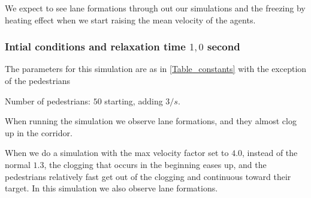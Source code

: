 We expect to see lane formations through out our simulations
and the freezing by heating effect when we start raising the mean velocity
of the agents.

\subsubsection{Intial conditions and relaxation time $1,0$ second}

The parameters for this simulation are as in \ref{Table_constants} with the exception of the pedestrians
\begin{itemize*}
    \item Number of pedestrians: $50$ starting, adding $3/s$.
\end{itemize*}

When running the simulation we observe lane formations, and they almost clog up
in the corridor.

When we do a simulation with the max velocity factor set to $4.0$, instead of the normal $1.3$, the clogging
that occurs in the beginning eases up, and the pedestrians relatively fast
get out of the clogging and continuous toward their target. In this simulation
we also observe lane formations.

